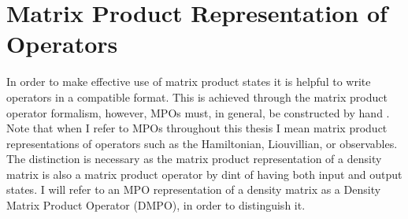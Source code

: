  \section{Matrix Product Representation of Operators}
 In order to make effective use of matrix product states it is helpful to write operators in a compatible format. This is achieved through the matrix product operator formalism, however, MPOs must, in general, be constructed by hand \cite{McCulloch2007,Crosswhite2008,Frowis2010,Pirvu2010,Schollwock2011}. Note that when I refer to MPOs throughout this thesis I mean matrix product representations of operators such as the Hamiltonian, Liouvillian, or observables. The distinction is necessary as the matrix product representation of a density matrix is also a matrix product operator by dint of having both input and output states. I will refer to an MPO representation of a density matrix as a Density Matrix Product Operator (DMPO), in order to distinguish it.

